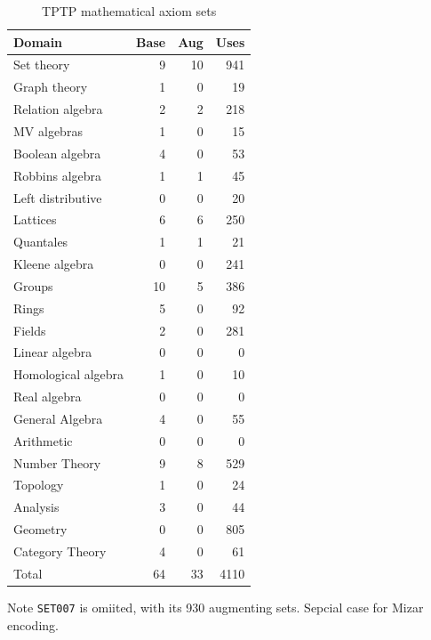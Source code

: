 \documentclass[runningheads]{llncs}
\begin{document}
\begin{table}[tb]
\begin{center}
\setlength{\tabcolsep}{4pt}
\begin{tabular}{l|rrr}
Domain              & Base & Aug  & Uses \\
\hline
Set theory          &    9 &   10 & 941  \\
Graph theory        &    1 &    0 &  19  \\
Relation algebra    &    2 &    2 & 218  \\
MV algebras         &    1 &    0 &  15  \\
Boolean algebra     &    4 &    0 &  53  \\
Robbins algebra     &    1 &    1 &  45  \\
Left distributive   &    0 &    0 &  20  \\
Lattices            &    6 &    6 & 250  \\
Quantales           &    1 &    1 &  21  \\
Kleene algebra      &    0 &    0 & 241  \\
Groups              &   10 &    5 & 386  \\
Rings               &    5 &    0 &  92  \\
Fields              &    2 &    0 & 281  \\
Linear algebra      &    0 &    0 &   0  \\
Homological algebra &    1 &    0 &  10  \\
Real algebra        &    0 &    0 &   0  \\
General Algebra     &    4 &    0 &  55  \\
Arithmetic          &    0 &    0 &   0  \\
Number Theory       &    9 &    8 & 529  \\
Topology            &    1 &    0 &  24  \\
Analysis            &    3 &    0 &  44  \\
Geometry            &    0 &    0 & 805  \\
Category Theory     &    4 &    0 &  61  \\
\hline
Total               &   64 &   33 & 4110 \\
\end{tabular}
\end{center}
\caption{TPTP mathematical axiom sets}
\label{AxiomSets}
\end{table}

Note {\tt SET007} is omiited, with its 930 augmenting sets.
Sepcial case for Mizar encoding.
\end{document}

